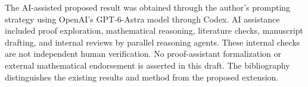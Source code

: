 \documentclass[11pt]{article}
\theoremstyle{remark}
\numberwithin{equation}{section}
\begin{document}
The AI-assisted proposed result was obtained through the author's
prompting strategy using OpenAI's
GPT-6-Astra model through Codex. AI assistance included proof
exploration, mathematical reasoning, literature checks, manuscript
drafting, and internal reviews by parallel reasoning agents.
These internal checks are not independent human verification.
No proof-assistant formalization or external mathematical endorsement
is asserted in this draft. The bibliography distinguishes the existing
results and method from the proposed extension.



\end{document}
